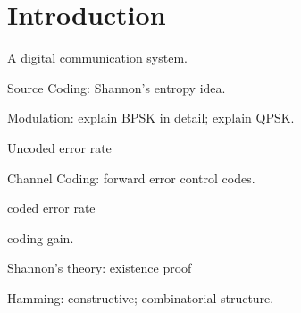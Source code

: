 \Contributor{}

\lstset{style=mystyle}

	\MakeScribeTop

\section{Introduction}

A digital communication system. 

Source Coding: Shannon's entropy idea. 


Modulation: explain BPSK in detail; explain QPSK. 

Uncoded error rate

Channel Coding: forward error control codes. 

coded error rate

coding gain. 


Shannon's theory: existence proof

Hamming: constructive; combinatorial structure.